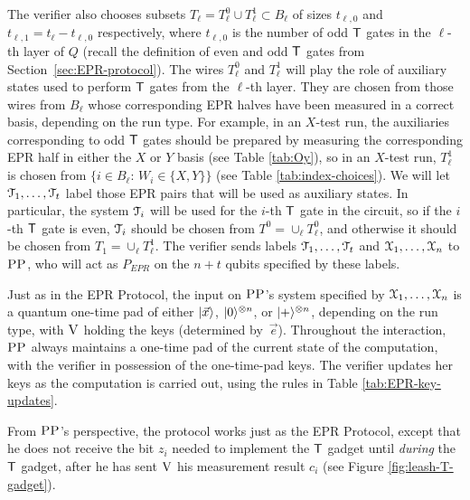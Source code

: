 The verifier also chooses subsets $T_\ell = T_\ell^0 \cup T_\ell^1 \subset B_\ell$ of sizes $t_{\ell,0}$ and $t_{\ell,1} = t_\ell-t_{\ell,0}$ respectively, where $t_{\ell,0}$ is the number of odd $\sf T$ gates in the $\ell$-th layer of $Q$ (recall the definition of even and odd $\sf T$ gates from Section~\ref{sec:EPR-protocol}). The wires $T^0_\ell$ and $T^1_\ell$ will play the role of auxiliary states used to perform $\sf T$ gates from the $\ell$-th layer. They are chosen from those wires from $B_\ell$ whose corresponding EPR halves have been measured in a correct basis, depending on the run type.  For example, in an $X$-test run, the auxiliaries corresponding to odd $\sf T$ gates should be prepared by measuring the corresponding EPR half in either the $X$ or $Y$ basis (see Table \ref{tab:Oy}), so in an $X$-test run, $T_\ell^1$ is chosen from $\{i\in B_\ell:\,W_i\in \{X,Y\}\}$ (see Table \ref{tab:index-choices}). We will let ${\cal T}_1,\dots,{\cal T}_t$ label those EPR pairs that will be used as auxiliary states. In particular, the system ${\cal T}_i$ will be used for the $i$-th $\sf T$ gate in the circuit, so if the $i$-th $\sf T$ gate is even, ${\cal T}_i$ should be chosen from $T^0=\cup_\ell T_\ell^0$, and otherwise it should be chosen from $T_1=\cup_\ell T_\ell^1$. The verifier sends labels ${\cal T}_1,\dots,{\cal T}_t$ and ${\cal X}_1,\dots,{\cal X}_n$ to $\textsc{PP}$, who will act as $P_{EPR}$ on the $n+t$ qubits specified by these labels.


Just as in the EPR Protocol, the input on $\textsc{PP}$'s system specified by ${\cal X}_1,\dots,{\cal X}_n$ is a quantum one-time pad of either $|\vec{x}\rangle$, $|0\rangle^{\otimes n}$, or $|+\rangle^{\otimes n}$, depending on the run type, with $\textsc{V}$ holding the keys (determined by~$\vec{e}$). Throughout the interaction, $\textsc{PP}$ always maintains a one-time pad of the current state of the computation, with the verifier in possession of the one-time-pad keys. The verifier updates her keys as the computation is carried out, using the rules in Table \ref{tab:EPR-key-updates}. 




From $\textsc{PP}$'s perspective, the protocol works just as the EPR Protocol, except that he does not receive the bit $z_i$ needed to implement the $\sf T$ gadget until \emph{during} the $\sf T$ gadget, after he has sent $\textsc{V}$ his measurement result $c_i$ (see Figure \ref{fig:leash-T-gadget}).


 




